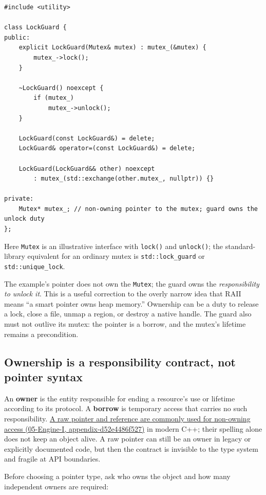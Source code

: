 \begin{verbatim}
#include <utility>

class LockGuard {
public:
    explicit LockGuard(Mutex& mutex) : mutex_(&mutex) {
        mutex_->lock();
    }

    ~LockGuard() noexcept {
        if (mutex_)
            mutex_->unlock();
    }

    LockGuard(const LockGuard&) = delete;
    LockGuard& operator=(const LockGuard&) = delete;

    LockGuard(LockGuard&& other) noexcept
        : mutex_(std::exchange(other.mutex_, nullptr)) {}

private:
    Mutex* mutex_; // non-owning pointer to the mutex; guard owns the unlock duty
};
\end{verbatim}

Here \texttt{Mutex} is an illustrative interface with \texttt{lock()} and \texttt{unlock()}; the standard-library equivalent for an ordinary mutex is \texttt{std::lock\_guard} or \texttt{std::unique\_lock}.

The example's pointer does not own the \texttt{Mutex}; the guard owns the \emph{responsibility to unlock it}. This is a useful correction to the overly narrow idea that RAII means ``a smart pointer owns heap memory.'' Ownership can be a duty to release a lock, close a file, unmap a region, or destroy a native handle. The guard also must not outlive its mutex: the pointer is a borrow, and the mutex's lifetime remains a precondition.

\subsection{Ownership is a responsibility contract, not pointer syntax}\label{01-foundations-i-ch004-ownership-is-a-responsibility-contract-not-pointer-syntax}

An \textbf{owner} is the entity responsible for ending a resource's use or lifetime according to its protocol. A \textbf{borrow} is temporary access that carries no such responsibility. \href{../05-Engine-I/main.pdf\#nameddest=appendix-d52e4486f527}{A raw pointer and reference are commonly used for non-owning access (05-Engine-I, appendix-d52e4486f527)} in modern C++; their spelling alone does not keep an object alive. A raw pointer can still be an owner in legacy or explicitly documented code, but then the contract is invisible to the type system and fragile at API boundaries.

Before choosing a pointer type, ask who owns the object and how many independent owners are required:

